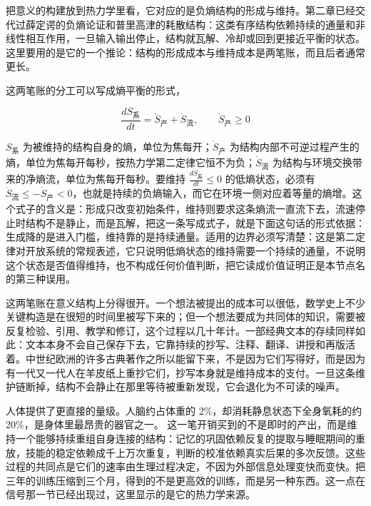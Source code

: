 
把意义的构建放到热力学里看，它对应的是负熵结构的形成与维持。第二章已经交代过薛定谔的负熵论证和普里高津的耗散结构\cite{schrodinger1944,nicolis1977,prigogine1977nobel}：这类有序结构依赖持续的通量和非线性相互作用，一旦输入输出停止，结构就瓦解、冷却或回到更接近平衡的状态。这里要用的是它的一个推论：结构的形成成本与维持成本是两笔账，而且后者通常更长。

这两笔账的分工可以写成熵平衡的形式，

\begin{equation}
\frac{dS_{\text{系}}}{dt}=\dot S_{\text{产}}+\dot S_{\text{流}},\qquad \dot S_{\text{产}}\ge 0
\end{equation}

$S_{\text{系}}$ 为被维持的结构自身的熵，单位为焦每开；$\dot S_{\text{产}}$ 为结构内部不可逆过程产生的熵，单位为焦每开每秒，按热力学第二定律它恒不为负；$\dot S_{\text{流}}$ 为结构与环境交换带来的净熵流，单位为焦每开每秒。要维持 $\frac{dS_{\text{系}}}{dt}\le 0$ 的低熵状态，必须有 $\dot S_{\text{流}}\le-\dot S_{\text{产}}<0$，也就是持续的负熵输入，而它在环境一侧对应着等量的熵增。这个式子的含义是：形成只改变初始条件，维持则要求这条熵流一直流下去，流速停止时结构不是静止，而是瓦解，把这一条写成式子，就是下面这句话的形式依据：生成降的是进入门槛，维持靠的是持续通量。适用的边界必须写清楚：这是第二定律对开放系统的常规表述，它只说明低熵状态的维持需要一个持续的通量，不说明这个状态是否值得维持，也不构成任何价值判断，把它读成价值证明正是本节点名的第三种误用。

这两笔账在意义结构上分得很开。一个想法被提出的成本可以很低，数学史上不少关键构造是在很短的时间里被写下来的；但一个想法要成为共同体的知识，需要被反复检验、引用、教学和修订，这个过程以几十年计。一部经典文本的存续同样如此：文本本身不会自己保存下去，它靠持续的抄写、注释、翻译、讲授和再版活着。中世纪欧洲的许多古典著作之所以能留下来，不是因为它们写得好，而是因为有一代又一代人在羊皮纸上重抄它们，抄写本身就是维持成本的支付。一旦这条维护链断掉，结构不会静止在那里等待被重新发现，它会退化为不可读的噪声。

人体提供了更直接的量级。人脑约占体重的 2\%，却消耗静息状态下全身氧耗的约 20\%，是身体里最昂贵的器官之一。\cite{raichle2002} 这一笔开销买到的不是即时的产出，而是维持一个能够持续重组自身连接的结构：记忆的巩固依赖反复的提取与睡眠期间的重放，技能的稳定依赖成千上万次重复，判断的校准依赖真实后果的多次反馈。这些过程的共同点是它们的速率由生理过程决定，不因为外部信息处理变快而变快。把三年的训练压缩到三个月，得到的不是更高效的训练，而是另一种东西。这一点在信号那一节已经出现过，这里显示的是它的热力学来源。

